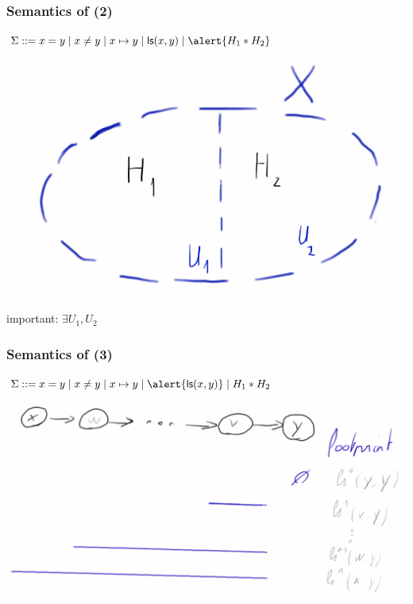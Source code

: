 \documentclass{beamer}
\begin{document}
\begin{frame}
\end{frame}

\begin{frame}
  \frametitle{Semantics of \JoshLogic (2)}
  $\Sigma ::= x = y \mid x \neq y \mid x \mapsto y \mid \liste{x}{y} \mid \alert{H_1 * H_2}$

\begin{center}
\includegraphics[scale=0.20]{resources/sl_star.png}
\end{center}

important: $ \exists U_1, U_2 $

\end{frame}

\begin{frame}
  \frametitle{Semantics of \JoshLogic (3)}
  $\Sigma ::= x = y \mid x \neq y \mid x \mapsto y \mid \alert{\liste{x}{y}} \mid H_1 * H_2$

\begin{center}
\includegraphics[scale=0.14]{resources/sl_ls.png}
\end{center}

\end{frame}

\end{document}
